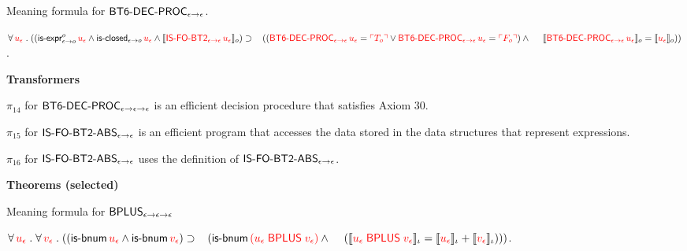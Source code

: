 \begin{biformthy}
    \item Meaning formula for $\mbox{\sf BT6-DEC-PROC}_{\epsilon \rightarrow \epsilon}$.


    $\forall\, \textcolor{red}{u_\epsilon} \mathrel. 
    ((\mbox{\sf is-expr}_{\epsilon \rightarrow o}^{o} \, 
    \textcolor{red}{u_\epsilon}  \wedge
    \mbox{\sf is-closed}_{\epsilon \rightarrow o} \, \textcolor{red}{u_\epsilon} \wedge 
    \llbracket\textcolor{red}{\mbox{\sf IS-FO-BT2}_{\epsilon \rightarrow \epsilon} \, 
    u_\epsilon}\rrbracket_o) \supset {}\\
    \hspace*{2ex}((\textcolor{red}{\mbox{\sf BT6-DEC-PROC}_{\epsilon \rightarrow \epsilon} \, u_\epsilon} = 
    \textcolor{red}{\ulcorner T_o\urcorner} \vee 
    \textcolor{red}{\mbox{\sf BT6-DEC-PROC}_{\epsilon \rightarrow \epsilon} \, u_\epsilon} = 
    \textcolor{red}{\ulcorner F_o\urcorner}) \wedge {}\\
    \hspace*{3.1ex}
    \llbracket\textcolor{red}{\mbox{\sf BT6-DEC-PROC}_{\epsilon \rightarrow \epsilon} \, u_\epsilon}\rrbracket_o =
    \llbracket\textcolor{red}{u_\epsilon}\rrbracket_o))$.

  \ee

  \item[] \textbf{Transformers}

  \be

    \setcounter{enumi}{13}

    \item $\pi_{14}$ for $\mbox{\sf BT6-DEC-PROC}_{\epsilon \rightarrow
      \epsilon \rightarrow \epsilon}$ is an efficient decision procedure
      that satisfies Axiom 30.


    \item $\pi_{15}$ for $\mbox{\sf IS-FO-BT2-ABS}_{\epsilon \rightarrow
      \epsilon}$ is an efficient program that accesses the data
      stored in the data structures that represent expressions.

    \item $\pi_{16}$ for $\mbox{\sf IS-FO-BT2-ABS}_{\epsilon \rightarrow
      \epsilon}$ uses the definition of
      $\mbox{\sf IS-FO-BT2-ABS}_{\epsilon \rightarrow \epsilon}$.

  \ee
    
  \item[] \textbf{Theorems (selected)}

    \be

      \setcounter{enumi}{2}

      \item Meaning formula for 
      $\mbox{\sf BPLUS}_{\epsilon \rightarrow \epsilon \rightarrow \epsilon}$

      $\forall\, \textcolor{red}{u_\epsilon} \mathrel. \forall\, \textcolor{red}{v_\epsilon} \mathrel.
      ((\mbox{\sf is-bnum} \, \textcolor{red}{u_\epsilon} \wedge \mbox{\sf is-bnum} \, \textcolor{red}{v_\epsilon}) 
      \supset {}\\
      \hspace*{2ex}(\mbox{\sf is-bnum} \, 
      \textcolor{red}{(u_\epsilon \; \mbox{\sf BPLUS} \; v_\epsilon)} \wedge {}\\
      \hspace*{2.8ex}(\llbracket\textcolor{red}{u_\epsilon \; \mbox{\sf BPLUS} \; 
      v_\epsilon}\rrbracket_\iota = 
      \llbracket\textcolor{red}{u_\epsilon}\rrbracket_\iota + \llbracket\textcolor{red}{v_\epsilon}\rrbracket_\iota)))$.


\end{biformthy}
